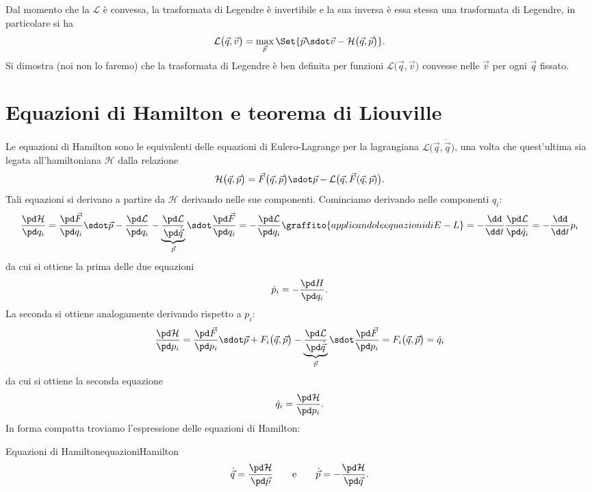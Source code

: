 \begin{oss}
	Dal momento che la \(\mathcal{L}\) è convessa, la trasformata di Legendre è invertibile e la sua inversa è essa stessa una trasformata di Legendre, in particolare si ha
	\[
		\mathcal{L}\big(\vec{q},\vec{v}\big) = \max_{\vec{p}} \Set{\vec{p}\sdot\vec{v} - \mathcal{H}\big(\vec{q},\vec{p}\big)}.
	\]
	Si dimostra (noi non lo faremo) che la trasformata di Legendre è ben definita per funzioni \(\mathcal{L}\big(\vec{q},\vec{v}\big)\) convesse nelle \(\vec{v}\) per ogni \(\vec{q}\) fissato.
\end{oss}

\section{Equazioni di Hamilton e teorema di Liouville}

Le equazioni di Hamilton sono le equivalenti delle equazioni di Eulero-Lagrange per la lagrangiana \(\mathcal{L}\big(\vec{q},\dot{\vec{q}}\big)\), una volta che quest'ultima sia legata all'hamiltoniana \(\mathcal{H}\) dalla relazione
\[
	\mathcal{H}\big(\vec{q},\vec{p}\big) = \vec{F}\big(\vec{q},\vec{p}\big) \sdot \vec{p} - \mathcal{L}\big(\vec{q},\vec{F}(\vec{q},\vec{p})\big).
\]
Tali equazioni si derivano a partire da \(\mathcal{H}\) derivando nelle sue componenti. Cominciamo derivando nelle componenti \(q_i\):
\[
	\frac{\pd\mathcal{H}}{\pd q_i} = \frac{\pd\vec{F}}{\pd q_i} \sdot \vec{p} - \frac{\pd\mathcal{L}}{\pd q_i} - \underbrace{\frac{\pd\mathcal{L}}{\pd\dot{\vec{q}}}}_{\vec{p}} \sdot \frac{\pd\vec{F}}{\pd q_i} = -\frac{\pd\mathcal{L}}{\pd q_i}\graffito{applicando le equazioni di E-L} = -\frac{\dd}{\dd t} \frac{\pd\mathcal{L}}{\pd \dot{q}_i} = -\frac{\dd}{\dd t}p_i
\]
da cui si ottiene la prima delle due equazioni
\[
	\dot{p}_i = -\frac{\pd H}{\pd q_i}.
\]
La seconda si ottiene analogamente derivando rispetto a \(p_i\):
\[
	\frac{\pd\mathcal{H}}{\pd p_i} = \frac{\pd\vec{F}}{\pd p_i} \sdot \vec{p} + F_i\big(\vec{q},\vec{p}\big) - \underbrace{\frac{\pd\mathcal{L}}{\pd\dot{\vec{q}}}}_{\vec{p}} \sdot \frac{\pd\vec{F}}{\pd p_i} = F_i\big(\vec{q},\vec{p}\big) = \dot{q}_i
\]
da cui si ottiene la seconda equazione
\[
	\dot{q}_i = \frac{\pd\mathcal{H}}{\pd p_i}.
\]
In forma compatta troviamo l'espressione delle equazioni di Hamilton:

\begin{remark}{Equazioni di Hamilton}{equazioniHamilton}
	\[
		\dot{\vec{q}} = \frac{\pd\mathcal{H}}{\pd\vec{p}} \qquad\text{e}\qquad \dot{\vec{p}} = -\frac{\pd\mathcal{H}}{\pd\vec{q}}.
	\]
\end{remark}

